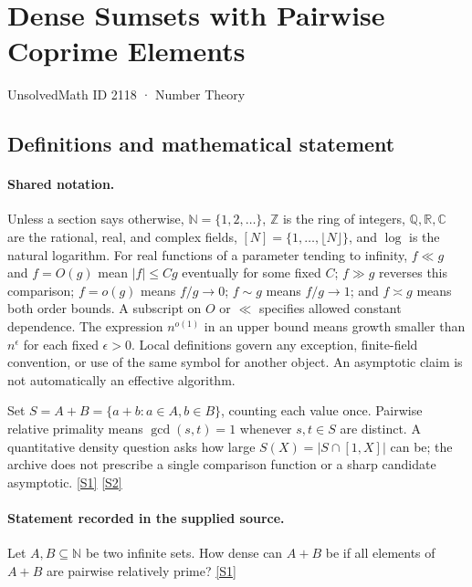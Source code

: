 \documentclass[11pt,a4paper]{article}
\newcommand{\N}{\mathbb{N}}
\newcommand{\Z}{\mathbb{Z}}
\newcommand{\Q}{\mathbb{Q}}
\newcommand{\R}{\mathbb{R}}
\newcommand{\C}{\mathbb{C}}
\newcommand{\sref}[2]{\hyperlink{source:#1:#2}{[S#2]}}
\begin{document}

\setcounter{section}{2117}

\section{Dense Sumsets with Pairwise Coprime Elements}\label{2118}

{\small\sffamily UnsolvedMath ID 2118 · Number Theory}

\subsection{Definitions and mathematical statement}

\paragraph{Shared notation.}Unless a section says otherwise, $\N=\{1,2,\ldots\}$,
$\Z$ is the ring of integers, $\Q,\R,\C$ are the rational, real, and complex
fields, $[N]=\{1,\ldots,\lfloor N\rfloor\}$, and $\log$ is the natural
logarithm. For real functions of a parameter tending to infinity,
$f\ll g$ and $f=O(g)$ mean $|f|\leq Cg$ eventually for some fixed $C$;
$f\gg g$ reverses this comparison; $f=o(g)$ means $f/g\to0$;
$f\sim g$ means $f/g\to1$; and $f\asymp g$ means both order bounds.
A subscript on $O$ or $\ll$ specifies allowed constant dependence.
The expression $n^{o(1)}$ in an upper bound means growth smaller than
$n^\epsilon$ for each fixed $\epsilon>0$. Local definitions govern any
exception, finite-field convention, or use of the same symbol for another
object. An asymptotic claim is not automatically an effective algorithm.



Set $S=A+B=\{a+b:a\in A,b\in B\}$, counting each value once. Pairwise relative primality means $\gcd(s,t)=1$ whenever $s,t\in S$ are distinct. A quantitative density question asks how large $S(X)=|S\cap[1,X]|$ can be; the archive does not prescribe a single comparison function or a sharp candidate asymptotic. \sref{2118}{1} \sref{2118}{2}

\paragraph{Statement recorded in the supplied source.}
Let $A,B\subseteq \mathbb{N}$ be two infinite sets. How dense can $A+B$ be if all elements of $A+B$ are pairwise relatively prime? \sref{2118}{1}
\end{document}
